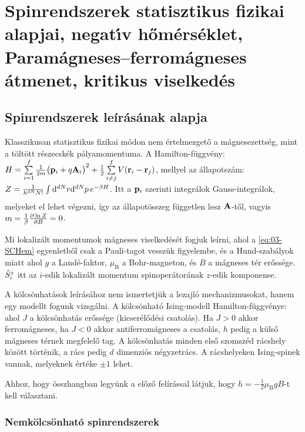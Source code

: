 \chapter{Spinrendszerek statisztikus fizikai alapjai, negat\'{\i}v h\H{o}m\'ers\'eklet, Pa\-ra\-m\'ag\-ne\-ses--fer\-ro\-m\'ag\-ne\-ses \'at\-me\-net, kritikus viselked\'es}
 
 \section{Spinrendszerek leírásának alapja}
  
  Klasszikusan statisztikus fizikai módon nem értelmezgető a mágnesezettség, mint a töltött részecskék pályamomentuma. A Hamilton-függvény: $H=\sum\limits_{i=1}^{f}\frac{1}{2m}\big(\mathbf{p}_i+q\mathbf{A}_i\big)^2+\frac{1}{2}\sum\limits_{i\ne j}^{f}V(\mathbf{r}_i-\mathbf{r}_j)$, mellyel az állapotszám: $Z=\frac{1}{h^{dN}N!}\int\limits_{}^{}\mathrm{d}^{dN}r\mathrm{d}^{dN}p\,e^{-\beta H}$. Itt a $\mathbf{p}_i$ szerinti integrálok Gauss-integrálok, melyeket el lehet végezni, így az állapotösszeg független lesz $\mathbf{A}$-től, vagyis $m=\frac{1}{\beta}\frac{\partial \ln Z}{\partial B}=0$.
  
  Mi lokalizált momentumok mágneses viselkedését fogjuk leírni, ahol a \eqref{eq:03-SCHem} egyenletből csak a Pauli-tagot vesszük figyelembe, és a Hund-szabályok miatt
   ahol $g$ a Landé-faktor, $\mu_\text{B}$ a Bohr-magneton, és $B$ a mágneses tér erőssége. $\hat{S}^z_i$ itt az $i$-edik lokalizált momentum spinoperátorának $z$-edik komponense.
  
  A kölcsönhatások leírásához nem ismertetjük a lezajló mechanizmusokat, hanem egy modellt fogunk vizsgálni. A kölcsönható Ising-modell Hamilton-függvénye:
  ahol $J$ a kölcsönhatás erőssége (kicserélődési csatolás). Ha $J>0$ akkor ferromágneses, ha $J<0$ akkor antiferromágneses a csatolás, $h$ pedig a külső mágneses térnek megfelelő tag. A kölcsönhatás minden első szomszéd rácshely között történik, a rács pedig $d$ dimenziós négyzetrács. A rácshelyeken Ising-spinek vannak, melyeknek értéke $\pm1$ lehet. 
  
  Ahhoz, hogy összhangban legyünk a előző felírással látjuk, hogy $h=-\frac{1}{2}\mu_\text{B}gB$-t kell választani.
  
  \subsection{Nemkölcsönható spinrendszerek}
   
